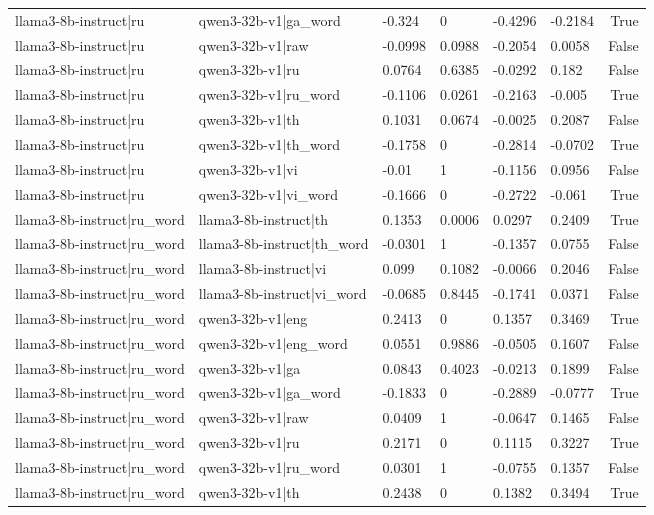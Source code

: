 \begin{table}
\begin{tabular}{llllllr}
llama3-8b-instruct|ru & qwen3-32b-v1|ga_word & -0.324 & 0 & -0.4296 & -0.2184 & True \\
llama3-8b-instruct|ru & qwen3-32b-v1|raw & -0.0998 & 0.0988 & -0.2054 & 0.0058 & False \\
llama3-8b-instruct|ru & qwen3-32b-v1|ru & 0.0764 & 0.6385 & -0.0292 & 0.182 & False \\
llama3-8b-instruct|ru & qwen3-32b-v1|ru_word & -0.1106 & 0.0261 & -0.2163 & -0.005 & True \\
llama3-8b-instruct|ru & qwen3-32b-v1|th & 0.1031 & 0.0674 & -0.0025 & 0.2087 & False \\
llama3-8b-instruct|ru & qwen3-32b-v1|th_word & -0.1758 & 0 & -0.2814 & -0.0702 & True \\
llama3-8b-instruct|ru & qwen3-32b-v1|vi & -0.01 & 1 & -0.1156 & 0.0956 & False \\
llama3-8b-instruct|ru & qwen3-32b-v1|vi_word & -0.1666 & 0 & -0.2722 & -0.061 & True \\
llama3-8b-instruct|ru_word & llama3-8b-instruct|th & 0.1353 & 0.0006 & 0.0297 & 0.2409 & True \\
llama3-8b-instruct|ru_word & llama3-8b-instruct|th_word & -0.0301 & 1 & -0.1357 & 0.0755 & False \\
llama3-8b-instruct|ru_word & llama3-8b-instruct|vi & 0.099 & 0.1082 & -0.0066 & 0.2046 & False \\
llama3-8b-instruct|ru_word & llama3-8b-instruct|vi_word & -0.0685 & 0.8445 & -0.1741 & 0.0371 & False \\
llama3-8b-instruct|ru_word & qwen3-32b-v1|eng & 0.2413 & 0 & 0.1357 & 0.3469 & True \\
llama3-8b-instruct|ru_word & qwen3-32b-v1|eng_word & 0.0551 & 0.9886 & -0.0505 & 0.1607 & False \\
llama3-8b-instruct|ru_word & qwen3-32b-v1|ga & 0.0843 & 0.4023 & -0.0213 & 0.1899 & False \\
llama3-8b-instruct|ru_word & qwen3-32b-v1|ga_word & -0.1833 & 0 & -0.2889 & -0.0777 & True \\
llama3-8b-instruct|ru_word & qwen3-32b-v1|raw & 0.0409 & 1 & -0.0647 & 0.1465 & False \\
llama3-8b-instruct|ru_word & qwen3-32b-v1|ru & 0.2171 & 0 & 0.1115 & 0.3227 & True \\
llama3-8b-instruct|ru_word & qwen3-32b-v1|ru_word & 0.0301 & 1 & -0.0755 & 0.1357 & False \\
llama3-8b-instruct|ru_word & qwen3-32b-v1|th & 0.2438 & 0 & 0.1382 & 0.3494 & True \\

\end{tabular}
\end{table}
